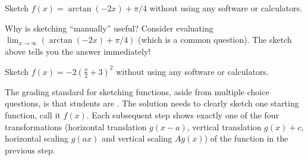 \documentclass[../main.tex]{subfiles}
\begin{document}

\clearpage
\begin{example}
  Sketch \(f(x) = \arctan(-2x) + \pi/4\) without using any software or calculators.


  


  

\end{example}

Why is sketching ``manually'' useful? Consider evaluating \(\lim_{x \to \infty} \left( \arctan(-2x) + \pi/4 \right)\) (which is a common question). The sketch above tells you the answer immediately!
\clearpage

\begin{exercise}
  Sketch \(f(x) = -2\left(\frac{x}{2} + 3\right)^{2}\) without using any software or calculators.

  The grading standard for sketching functions, aside from multiple choice questions, is that students are . The solution needs to clearly sketch one starting function, call it \(f(x)\). Each subsequent step shows exactly one of the four transformations (horizontal translation \(g(x - a)\), vertical translation \(g(x) + c\), horizontal scaling \(g(ax)\) and vertical scaling \(Ag(x)\)) of the function in the previous step.

\end{exercise}
\end{document}
